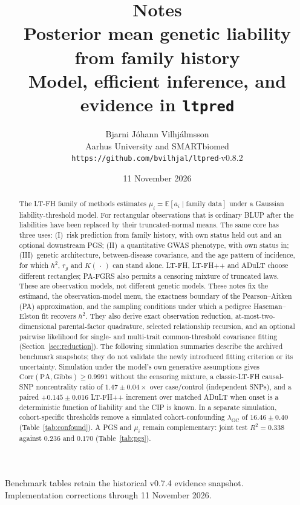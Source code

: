 \documentclass[11pt,a4paper]{article}
\title{%
  \vspace{-1.4em}
  {\large Notes}\\[0.4em]
  {\LARGE\bfseries Posterior mean genetic liability\\[0.15em]
  from family history}\\[0.55em]
  {\large Model, efficient inference, and evidence in \texttt{ltpred}}}
\author{Bjarni J\'ohann Vilhj\'almsson\\[0.35em]
  {\small Aarhus University and SMARTbiomed}\\[0.35em]
  {\small\texttt{https://github.com/bvilhjal/ltpred}\quad$\cdot$\quad v0.8.2}}
\date{11 November 2026}
\newcommand{\E}{\mathbb{E}}
\newcommand{\Corr}{\mathrm{Corr}}
\newcommand{\h}{h^{2}}
\begin{document}
\maketitle
\thispagestyle{plain}
\begin{center}\small
Benchmark tables retain the historical v0.7.4 evidence snapshot.\\
Implementation corrections through 11 November 2026.
\end{center}

\begin{abstract}
\noindent
The LT-FH family of methods estimates
$\mu_i=\E[a_i\mid \text{family data}]$ under a Gaussian
liability-threshold model.
For rectangular observations that is ordinary BLUP after the
liabilities have been replaced by their truncated-normal means.
The same core has three uses:
(I)~risk prediction from family history, with own status held out
and an optional downstream PGS;
(II)~a quantitative GWAS phenotype, with own status in;
(III)~genetic architecture, between-disease covariance, and the
age pattern of incidence, for which $\h$, $r_g$ and $K(\,\cdot\,)$
can stand alone.
LT-FH, LT-FH++ and ADuLT choose different rectangles; PA-FGRS also
permits a censoring mixture of truncated laws. These are observation
models, not different genetic models.
These notes fix the estimand, the observation-model menu, the
exactness boundary of the Pearson--Aitken (PA) approximation, and
the sampling conditions under which a pedigree Haseman--Elston
fit recovers \(\h\).
They also derive exact observation reduction, at-most-two-dimensional
parental-factor quadrature, selected relationship recursion, and an optional
pairwise likelihood for single- and multi-trait common-threshold covariance fitting
(Section~\ref{sec:reduction}).
The following simulation summaries describe the archived benchmark snapshots;
they do not validate the newly introduced fitting criterion or its uncertainty.
Simulation under the model's own generative assumptions gives
$\Corr(\mathrm{PA},\mathrm{Gibbs})\ge 0.9991$ without the censoring
mixture, a classic-LT-FH causal-SNP noncentrality ratio of
$1.47\pm 0.04\times$ over case/control (independent SNPs), and a
paired $+0.145\pm 0.016$ LT-FH++ increment over matched ADuLT when
onset is a deterministic function of liability and the CIP is known.
In a separate simulation, cohort-specific thresholds
remove a simulated cohort-confounding $\lambda_{\mathrm{GC}}$ of
$16.46\pm 0.40$ (Table~\ref{tab:confound}).
A PGS and $\mu_i$ remain complementary: joint test $R^{2}=0.338$
against $0.236$ and $0.170$ (Table~\ref{tab:pgs}).

\end{abstract}
\end{document}
